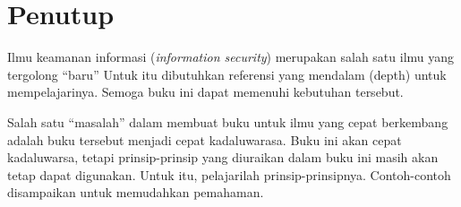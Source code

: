 \chapter{Penutup}
Ilmu keamanan informasi ({\em information security}) merupakan salah satu ilmu
yang tergolong ``baru'' Untuk itu dibutuhkan referensi yang mendalam (depth)
untuk mempelajarinya. Semoga buku ini dapat memenuhi kebutuhan tersebut.

Salah satu ``masalah'' dalam membuat buku untuk ilmu yang cepat berkembang
adalah buku tersebut menjadi cepat kadaluwarasa. Buku ini akan cepat
kadaluwarsa, tetapi prinsip-prinsip yang diuraikan dalam buku ini masih akan
tetap dapat digunakan. Untuk itu, pelajarilah prinsip-prinsipnya. Contoh-contoh
disampaikan untuk memudahkan pemahaman.

